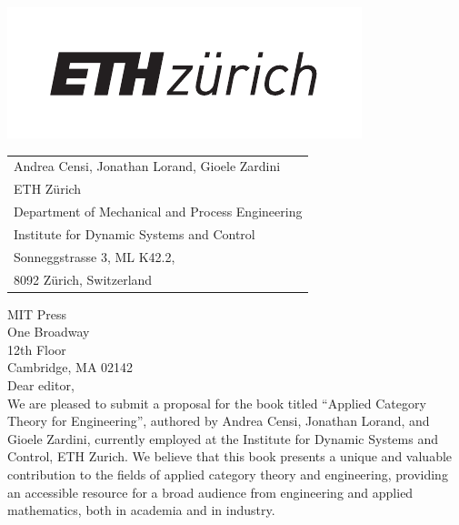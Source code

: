 \documentclass[10pt, article, one side]{memoir}
\begin{document}
    \begin{minipage}{0.45\linewidth}
        \includegraphics[width=0.9\linewidth]{pics/ethlogo.pdf}
        \vfill
    \end{minipage}
    \begin{minipage}{0.5\linewidth}
        \begin{flushright}
            \begin{tabular}{l}
                Andrea Censi, Jonathan Lorand, Gioele Zardini \\
                ETH Z\"urich \\
                Department of Mechanical and Process Engineering \\
                Institute for Dynamic Systems and Control \\
                Sonneggstrasse 3, ML K42.2, \\
                8092 Z\"urich, Switzerland
            \end{tabular}
        \end{flushright}
    \end{minipage}

    \vspace{1cm}

    \noindent MIT Press\\
    \noindent One Broadway\\
    \noindent 12th Floor \\
    \noindent Cambridge, MA 02142\\[+7pt]

    Dear editor,\\[-5pt]

    We are pleased to submit a proposal for the book titled ``Applied Category Theory for Engineering'', authored by 
    Andrea Censi, 
    Jonathan Lorand, and Gioele Zardini, currently employed at the Institute for Dynamic Systems and Control, ETH Zurich.
    We believe that this book presents a unique and valuable contribution to the fields of applied category theory and engineering, providing an accessible resource for a broad audience from engineering and applied mathematics, both in academia and in industry.
    \\[-7pt]
\end{document}
